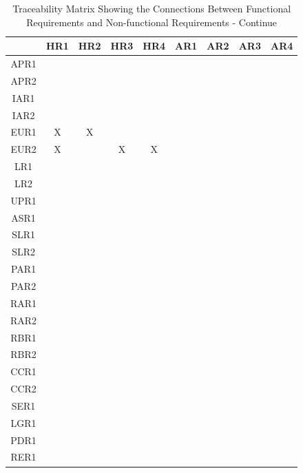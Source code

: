 \documentclass[12pt]{article}
\begin{document}
\begin{landscape}
\begin{table}[h!]
\centering
\begin{tabular}{|c|c|c|c|c|c|c|c|c|}
\hline
& HR1 & HR2 & HR3 & HR4 & AR1 & AR2 & AR3 & AR4 \\
\hline
APR1        & & & & & & & & \\ \hline
APR2        & & & & & & & & \\ \hline
IAR1        & & & & & & & & \\ \hline
IAR2        & & & & & & & & \\ \hline
EUR1        &X &X & & & & & & \\ \hline
EUR2        &X & &X &X & & & & \\ \hline
LR1         & & & & & & & & \\ \hline
LR2         & & & & & & & & \\ \hline
UPR1        & & & & & & & & \\ \hline
ASR1        & & & & & & & & \\ \hline
SLR1        & & & & & & & & \\ \hline
SLR2        & & & & & & & & \\ \hline
PAR1        & & & & & & & & \\ \hline
PAR2        & & & & & & & & \\ \hline
RAR1        & & & & & & & & \\ \hline
RAR2        & & & & & & & & \\ \hline
RBR1        & & & & & & & & \\ \hline
RBR2        & & & & & & & & \\ \hline
CCR1        & & & & & & & & \\ \hline
CCR2        & & & & & & & & \\ \hline
SER1        & & & & & & & & \\ \hline
LGR1        & & & & & & & & \\ \hline
PDR1        & & & & & & & & \\ \hline
RER1        & & & & & & & & \\ \hline
\end{tabular}
\caption{Traceability Matrix Showing the Connections Between Functional Requirements and Non-functional Requirements - Continue}
\label{Table:A_trace}
\end{table}
\end{landscape}
\end{document}
